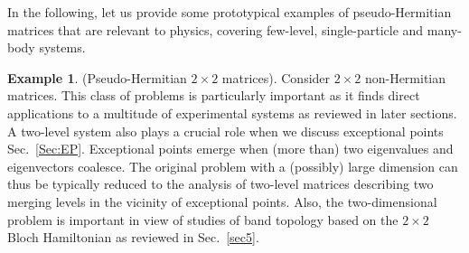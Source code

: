 \documentclass{tADP2e}
\theoremstyle{plain}
\theoremstyle{plain}
\theoremstyle{definition}
\newtheorem{example}{Example}[section]
\newcommand{\exmp}[1]{
\begin{example}
	#1
\end{example}
}
\begin{document}
{In the following, let us provide some prototypical examples of pseudo-Hermitian matrices that are relevant to physics,  covering few-level, single-particle and many-body systems.}
\exmp{\label{ph22}(Pseudo-Hermitian $2\times 2$ matrices).
Consider $2\times 2$ non-Hermitian matrices. This class of problems is particularly important as it finds direct applications to a multitude of experimental systems as reviewed in later sections. A two-level system also plays a crucial role when we discuss exceptional points Sec.~\ref{Sec:EP}. Exceptional points emerge when (more than) two eigenvalues and eigenvectors coalesce. The original problem with a (possibly) large dimension can thus be typically reduced to the analysis of two-level matrices describing two merging levels in the vicinity of exceptional points. Also, the two-dimensional problem is important in view of studies of band topology based on the $2\times 2$ Bloch Hamiltonian as reviewed in Sec.~\ref{sec5}.

}
\end{document}
